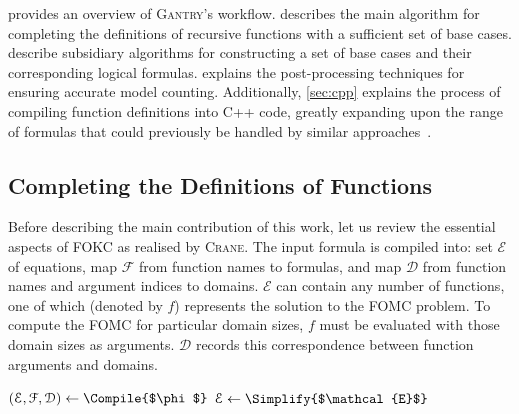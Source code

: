 \documentclass[a4paper,UKenglish,cleveref, autoref, thm-restate]{lipics-v2021}
\newcommand{\Cranetwo}{\textsc{Gantry}}
\begin{document}
 provides an overview of \Cranetwo{}'s workflow.
 describes the main algorithm for completing the
definitions of recursive functions with a sufficient set of base cases.
 describe subsidiary algorithms for
constructing a set of base cases and their corresponding logical formulas.
 explains the post-processing techniques for ensuring
accurate model counting. Additionally, \cref{sec:cpp} explains the process of
compiling function definitions into C++ code, greatly expanding upon the range
of formulas that could previously be handled by similar
approaches~\cite{DBLP:conf/kr/KazemiP16}.

\subsection{Completing the Definitions of Functions}\label{sec:completing}

Before describing the main contribution of this work, let us review the
essential aspects of FOKC as realised by \textsc{Crane}. The input formula is
compiled into: set $\mathcal{E}$ of equations, map $\mathcal{F}$ from function
names to formulas, and map $\mathcal{D}$ from function names and argument
indices to domains. $\mathcal{E}$ can contain any number of functions, one of
which (denoted by $f$) represents the solution to the FOMC problem. To compute
the FOMC for particular domain sizes, $f$ must be evaluated with those domain
sizes as arguments. $\mathcal{D}$ records this correspondence between function
arguments and domains.

\begin{algorithm}[t]
  \caption{\protect\CompileWithBaseCases{$\phi$}}\label{alg:compilewithbasecases}
  $(\mathcal{E}, \mathcal{F}, \mathcal{D}) \gets \Compile{$\phi$}$\;
  $\mathcal{E} \gets \Simplify{$\mathcal{E}$}$\;\label{line:second}
\end{algorithm}
\end{document}
